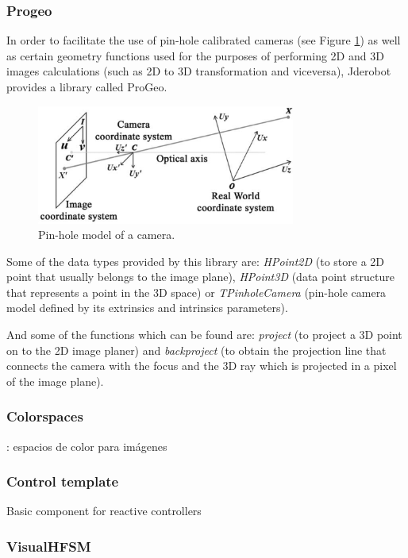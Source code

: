 \documentclass[twocolumn]{svjour3}          %
\begin{document}
\subsubsection{Progeo}
\label{subsec:progeo}

In order to facilitate the use of pin-hole calibrated cameras (see Figure \ref{fig:pinholemodel}) as well as certain geometry functions used for the purposes of performing 2D and 3D images calculations (such as 2D to 3D transformation and viceversa), Jderobot provides a library called ProGeo.

\begin{figure}[h!]
  \includegraphics[width=8.5cm]{figs/pinholemodel.png}
\caption{Pin-hole model of a camera.}
\label{fig:pinholemodel}
\end{figure}

Some of the data types provided by this library are: \textit{HPoint2D} (to store a 2D point that usually belongs to the image plane), \textit{HPoint3D} (data point structure that represents a point in the 3D space) or \textit{TPinholeCamera} (pin-hole camera model defined by its extrinsics and intrinsics parameters).

And some of the functions which can be found are: \textit{project} (to project a 3D point on to the 2D image planer) and \textit{backproject} (to obtain the projection line that connects the camera with the focus and the 3D ray which is projected in a pixel of the image plane).

\subsubsection{Colorspaces}: espacios de color para imágenes

\subsubsection{Control template}
Basic component for reactive controllers



\subsubsection{VisualHFSM}
\end{document}
